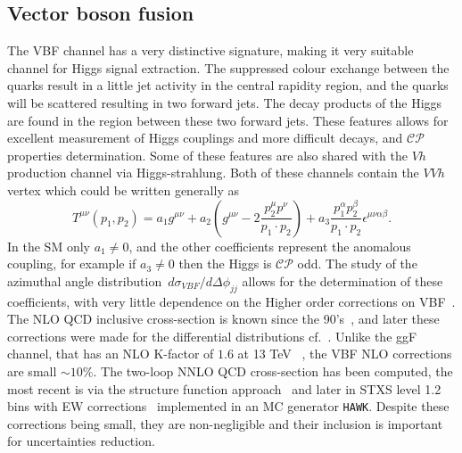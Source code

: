 \subsection{Vector boson fusion}
The VBF channel has a very distinctive signature, making it very suitable channel for Higgs signal extraction. The suppressed colour exchange between the quarks result in a little jet activity in the central rapidity region, and the quarks will be scattered resulting in two forward jets. The decay products of the Higgs are found in the region between these two forward jets.  These features allows for excellent measurement of Higgs couplings and more difficult decays, and $\mathcal{CP}$ properties determination. Some of these features are also shared with the $Vh$ production channel via Higgs-strahlung. Both of these channels contain the $VVh$ vertex which could be written generally as~\cite{LHCHiggsCrossSectionWorkingGroup:2016ypw}
\begin{equation}
T^{\mu \nu}(p_1,p_2) = a_1 g^{\mu \nu}+ a_2  \left(g^{\mu \nu}- 2\frac{p^\mu_{2} p^\nu }{p_1 \cdot p_2} \right)  + a_3 \frac{p_1^\alpha p_2^ \beta}{p_1 \cdot p_2}\epsilon^{\mu \nu \alpha \beta}. 
\end{equation} 
In the SM only $a_1\neq0$, and the other coefficients represent the anomalous coupling, for example if $a_3 \neq0$ then the Higgs is  $\mathcal{CP}$  odd. The study of the azimuthal angle distribution~$d \sigma_{VBF} / d \Delta \phi_{jj}$ allows for  the determination of these coefficients, with very little dependence on the Higher order corrections on VBF~\cite{hankele2006anomalous}.\\  The NLO QCD inclusive cross-section is known since the 90's~\cite{Han:1992hr}, and later these corrections were made for the differential distributions cf.~\cite{Figy:2003nv,Berger:2004pca}. Unlike the ggF channel, that has an NLO  K-factor of $1.6$ at 13 TeV~\cite{Gomez-Bock:2007azi} , the VBF NLO corrections are small $\sim 10\%$. The two-loop NNLO QCD cross-section has been computed, the most recent is via the structure function approach~\cite{Bolzoni:2010xr} and later in STXS level 1.2 bins with EW corrections~\cite{Denner:2014cla} implemented in an MC generator  \texttt{HAWK}. Despite these corrections being small, they are non-negligible and their inclusion is important for uncertainties reduction.
